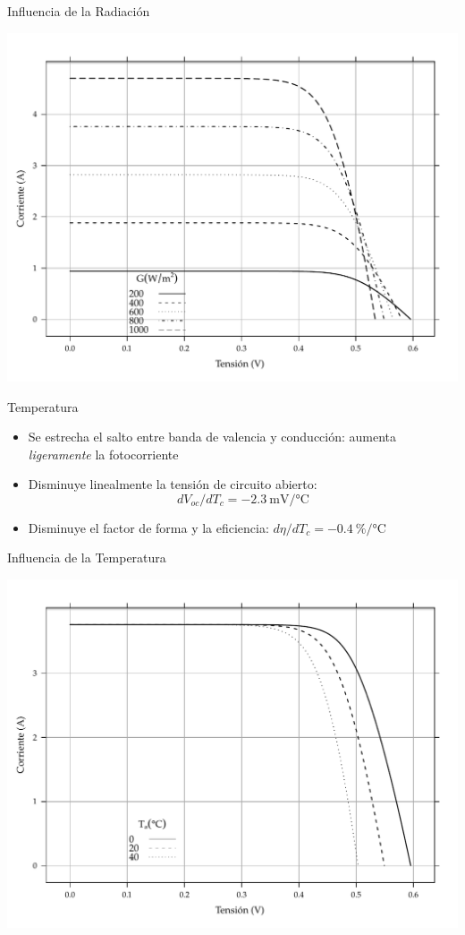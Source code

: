 \documentclass[xcolor={usenames,svgnames,dvipsnames}]{beamer}
\begin{document}
\begin{frame}[label={sec:orgd91d66b}]{Influencia de la Radiación}
\begin{center}
\includegraphics[width=.9\linewidth]{../figs/CurvaIV_Ta20.pdf}
\end{center}
\end{frame}

\begin{frame}[label={sec:orgc9f7563}]{Temperatura}
\begin{itemize}
\item Se estrecha el salto entre banda de valencia y conducción: aumenta \emph{ligeramente} la fotocorriente

\item \alert{Disminuye linealmente la tensión de circuito abierto}: 
\[
  \boxed{dV_{oc}/dT_{c}=\SI{-2.3}{\milli\volt\per\celsius}}
\]

\item Disminuye el factor de forma y la eficiencia:
\(d\eta/dT_{c}=\SI{-0.4}{\percent\per\celsius}\)
\end{itemize}
\end{frame}

\begin{frame}[label={sec:org13544a7}]{Influencia de la Temperatura}
\begin{center}
\includegraphics[width=.9\linewidth]{../figs/CurvaIV_G800.pdf}
\end{center}
\end{frame}
\end{document}
